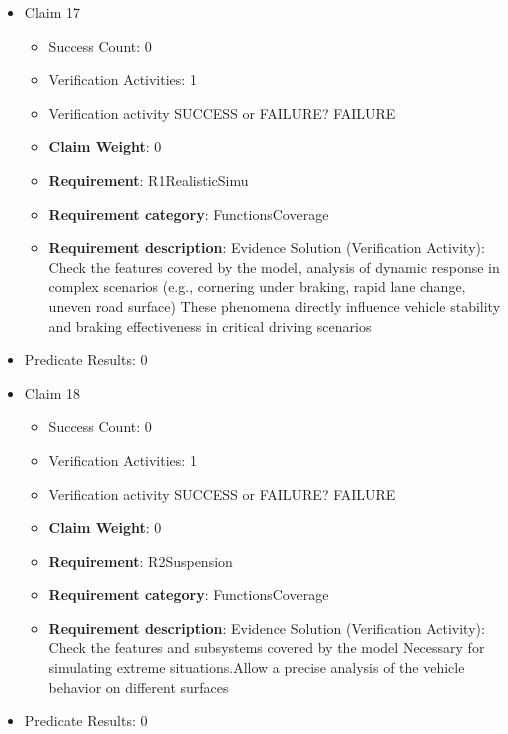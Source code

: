 \documentclass{article}
\begin{document}
\begin{itemize}
  				  \item Claim 17
				\begin{itemize}
			    	\item Success Count: 0 
			    	\item Verification Activities: 1
					\item Verification activity SUCCESS or FAILURE? FAILURE
					\item \textbf{Claim Weight}: 0
						\item \textbf{Requirement}: R1RealisticSimu 
						\item \textbf{Requirement category}: FunctionsCoverage 
						\item \textbf{Requirement description}: Evidence Solution (Verification Activity): Check the features covered by the model, analysis of dynamic response in complex scenarios (e.g., cornering under braking, rapid lane change, uneven road surface)  These phenomena directly influence vehicle stability and braking effectiveness in critical driving scenarios
					
				\end{itemize}
				
									    
				\item Predicate Results: 0

  				  \item Claim 18
				\begin{itemize}
			    	\item Success Count: 0 
			    	\item Verification Activities: 1
					\item Verification activity SUCCESS or FAILURE? FAILURE
					\item \textbf{Claim Weight}: 0
						\item \textbf{Requirement}: R2Suspension 
						\item \textbf{Requirement category}: FunctionsCoverage 
						\item \textbf{Requirement description}: Evidence Solution (Verification Activity): Check the features and subsystems covered by the model Necessary for simulating extreme situations.Allow a precise analysis of the vehicle behavior on different surfaces
					
				\end{itemize}
				
									    
				\item Predicate Results: 0


\end{itemize}
\end{document}
